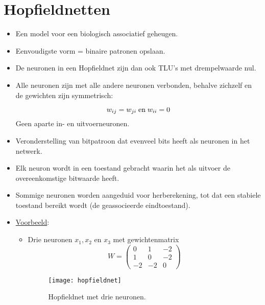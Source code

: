 \section{Hopfieldnetten}
\begin{itemize}
    \item Een model voor een biologisch associatief geheugen.
    \item Eenvoudigste vorm = binaire patronen opslaan.
    \item De neuronen in een Hopfieldnet zijn dan ook TLU's met drempelwaarde nul.
    \item Alle neuronen zijn met alle andere neuronen verbonden, behalve zichzelf en de gewichten zijn symmetrisch:

    $$w_{ij} = w_{ji} \; \hbox{en} \; w_{ii} = 0$$
    \alert Geen aparte in- en uitvoerneuronen.
    \item Veronderstelling van bitpatroon dat evenveel bits heeft als neuronen in het netwerk.
    \item Elk neuron wordt in een toestand gebracht waarin het als uitvoer de overeenkomstige bitwaarde heeft.
    \item Sommige neuronen worden aangeduid voor herberekening, tot dat een stabiele toestand bereikt wordt (de geassocieerde eindtoestand).
    \item \underline{Voorbeeld}:
    \begin{itemize}
        \item Drie neuronen $x_1, x_2$ en $x_3$ met gewichtenmatrix
        $$W = \begin{pmatrix}
            0 & 1 & -2 \\
            1 & 0 & -2 \\
            -2 & -2 & 0
        \end{pmatrix}$$
        \begin{figure}[ht]
            \centering
            \texttt{[image: hopfieldnet]}
            \caption{Hopfieldnet met drie neuronen.}
            

\end{figure}
\end{itemize}
\end{itemize}
